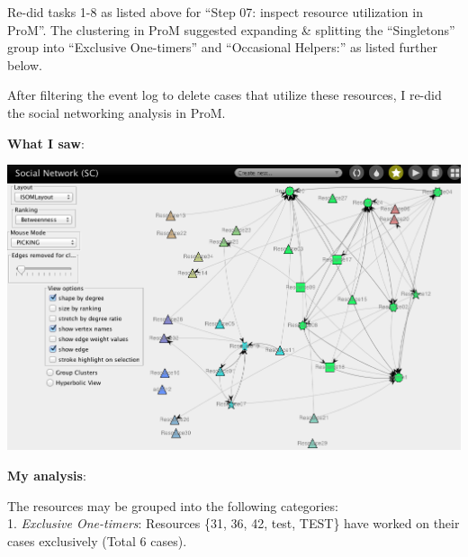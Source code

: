 \documentclass[]{article}
\begin{document}
Re-did tasks 1-8 as listed above for ``Step 07: inspect resource
utilization in ProM''. The clustering in ProM suggested expanding \&
splitting the ``Singletons'' group into ``Exclusive One-timers'' and
``Occasional Helpers:'' as listed further below.

After filtering the event log to delete cases that utilize these
resources, I re-did the social networking analysis in ProM.

\textbf{What I saw}:

\includegraphics{CoSeLoG_Step_07_excl_one-timers_SocialNet.png}

\textbf{My analysis}:

The resources may be grouped into the following categories:\\1.
\emph{Exclusive One-timers}: Resources \{31, 36, 42, test, TEST\} have
worked on their cases exclusively (Total 6 cases).
\end{document}
